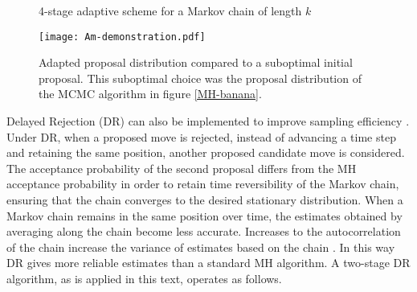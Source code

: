 \begin{figure}[h]
\begin{minipage}{1.0\linewidth}
\centering
\end{minipage}

\caption{4-stage adaptive scheme for a Markov chain of length $k$}
\label{4-stage-am}
\end{figure}

\begin{figure}[H]
	\centering
	\texttt{[image: Am-demonstration.pdf]}
	\caption{Adapted proposal distribution compared to a suboptimal initial proposal. This suboptimal choice was the proposal distribution of the MCMC algorithm in figure \ref{MH-banana}.}
	\label{AM-demonstration}
\end{figure}

Delayed Rejection (DR) can also be implemented to improve sampling efficiency \citep{Mira2001}. Under DR, when a proposed move is rejected, instead of advancing a time step and retaining the same position, another proposed candidate move is considered. The acceptance probability of the second proposal differs from the MH acceptance probability in order to retain time reversibility of the Markov chain, ensuring that the chain converges to the desired stationary distribution. When a Markov chain remains in the same position over time, the estimates obtained by averaging along the chain become less accurate. Increases to the autocorrelation of the chain increase the variance of estimates based on the chain \citep{Mira2001}. In this way DR gives more reliable estimates than a standard MH algorithm. A two-stage DR algorithm, as is applied in this text, operates as follows. \\

